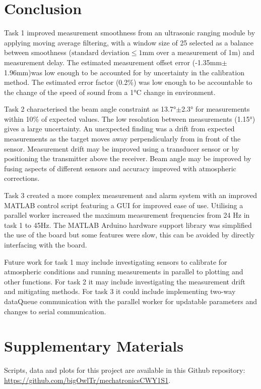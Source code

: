 \documentclass[a4paper,12pt]{article}
\begin{document}
\section{Conclusion}
Task 1 improved measurement smoothness from an ultrasonic ranging module by applying moving average filtering, with a window size of 25 selected as a balance between smoothness ($\text{standard deviation}\leq1$mm over a measurement of 1m) and measurement delay. The estimated measurement offset error (-1.35mm$\pm$1.96mm)was low enough to be accounted for by uncertainty in the calibration method. The estimated error factor (0.2\%) was low enough to be accountable to the change of the speed of sound from a 1°C change in environment. 


Task 2 characterised the beam angle constraint as 13.7°$\pm$2.3° for measurements within 10\% of expected values. The low resolution between measurements (1.15°) gives a large uncertainty. An unexpected finding was a drift from expected measurements as the target moves away perpendicularly from in front of the sensor. Measurement drift may be improved using a transducer sensor or by positioning the transmitter above the receiver. Beam angle may be improved by fusing aspects of different sensors and accuracy improved with atmospheric corrections. 


Task 3 created a more complex measurement and alarm system with an improved MATLAB control script featuring a GUI for improved ease of use. Utilising a parallel worker increased the maximum measurement frequencies from 24 Hz in task 1 to 45Hz. The MATLAB Arduino hardware support library was simplified the use of the board but some features were slow, this can be avoided by directly interfacing with the board.


Future work for task 1 may include investigating sensors to calibrate for atmospheric conditions and running measurements in parallel to plotting and other functions. For task 2 it may include investigating the measurement drift and mitigating methods. For task 3 it could include implementing two-way dataQueue communication with the parallel worker for updatable parameters and changes to serial communication.


\section{Supplementary Materials}
Scripts, data and plots for this project are available in this Github repository: \url{https://github.com/bigOwlTr/mechatronicsCWY1S1}.
\end{document}
